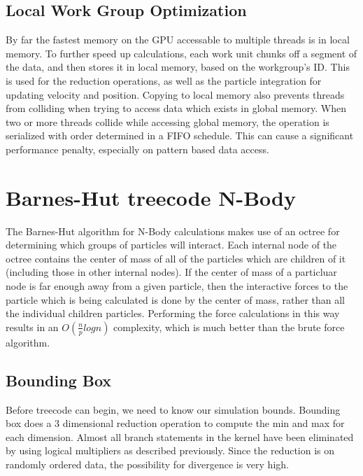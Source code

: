 \documentclass[fleqn,10pt]{SelfArx} %
\begin{document}
\subsection{Local Work Group Optimization}
By far the fastest memory on the GPU accessable to multiple threads is in local memory. To further speed up calculations, each work unit chunks off a segment of the data, and then stores it in local memory, based on the workgroup’s ID. This is used for the reduction operations, as well as the particle integration for updating velocity and position. Copying to local memory also prevents threads from colliding when trying to access data which exists in global memory. When two or more threads collide while accessing global memory, the operation is serialized with order determined in a FIFO schedule. This can cause a significant performance penalty, especially on pattern based data access.




\section{Barnes-Hut treecode N-Body}
The Barnes-Hut algorithm for N-Body calculations makes use of an octree for determining which groups of particles will interact. Each internal node of the octree contains the center of mass of all of the particles which are children of it (including those in other internal nodes). If the center of mass of a particluar node is far enough away from a given particle, then the interactive forces to the particle which is being calculated is done by the center of mass, rather than all the individual children particles. Performing the force calculations in this way results in an $O(\frac{n}{p} log n)$ complexity, which is much better than the brute force algorithm.

\subsection{Bounding Box}
Before treecode can begin, we need to know our simulation bounds. Bounding box does a 3 dimensional reduction operation to compute the min and max for each dimension. Almost all branch statements in the kernel have been eliminated by using logical multipliers as described previously. Since the reduction is on randomly ordered data, the possibility for divergence is very high. 
\end{document}
